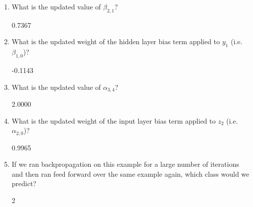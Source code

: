 \documentclass[11pt]{article}
\numberwithin{equation}{section} %
\numberwithin{figure}{section} %
\numberwithin{table}{section} %
\begin{document}
\begin{enumerate}
     \begin{enumerate}
        \item What is the updated value of ${\beta}_{2,1}$?
        
        \begin{tcolorbox}[fit,height=1cm, width=2cm, blank, borderline={1pt}{-2pt}]
            0.7367 
        \end{tcolorbox}
        
        
        \item What is the updated weight of the hidden layer bias term applied to $y_1$ (i.e. ${\beta}_{1,0}$)?
        
        \begin{tcolorbox}[fit,height=1cm, width=2cm, blank, borderline={1pt}{-2pt}]
            -0.1143 
        \end{tcolorbox}
        
        
        \item What is the updated value of ${\alpha}_{3,4}$?
        
        \begin{tcolorbox}[fit,height=1cm, width=2cm, blank, borderline={1pt}{-2pt}]
            2.0000 
        \end{tcolorbox}
        
        
        \item What is the updated weight of the input layer bias term applied to $z_2$ (i.e. ${\alpha}_{2,0}$)?
        
        \begin{tcolorbox}[fit,height=1cm, width=2cm, blank, borderline={1pt}{-2pt}]
            0.9965 
        \end{tcolorbox}
        
        
        \item If we ran backpropagation on this example for a large number of iterations and then ran feed forward over the same example again, which class would we predict?
        
        \begin{tcolorbox}[fit,height=1cm, width=2cm, blank, borderline={1pt}{-2pt}]
            2 
        \end{tcolorbox}
        

    \end{enumerate}


\end{enumerate}
\end{document}
